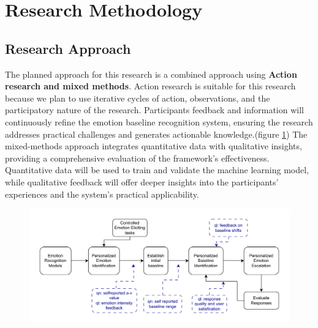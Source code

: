 \section{Research Methodology }

\subsection{Research Approach}
\par The planned approach for this research is a combined approach using \textbf{Action research and mixed methods}.
\newline
Action research is suitable for this research because we plan to use iterative cycles of action, observations, and the participatory nature of the research. Participants feedback and information will continuously refine the emotion baseline recognition system, ensuring the research addresses practical challenges and generates actionable knowledge.(figure \ref{fig:action})
\newline 
The mixed-methods approach integrates quantitative data with qualitative insights, providing a comprehensive evaluation of the framework's effectiveness. Quantitative data will be used to train and validate the machine learning model, while qualitative feedback will offer deeper insights into the participants' experiences and the system's practical applicability. 

\begin{figure}[h]
\centering
\includegraphics[width=1\textwidth]{img/chapter_01/action-plan.jpg}
\label{fig:action}
\end{figure}